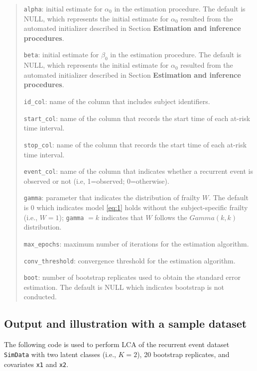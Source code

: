 \begin{quote}
\texttt{alpha}: initial estimate for \(\alpha_0\) in the estimation procedure. The default is NULL, which represents the initial estimate for \(\alpha_0\) resulted from the automated initializer described in Section \textbf{Estimation and inference procedures}.

\texttt{beta}: initial estimate for \({\beta_0}\) in the estimation procedure.
The default is NULL, which represents the initial estimate for \(\alpha_0\) resulted from the automated initializer described in
Section \textbf{Estimation and inference procedures}.

\texttt{id\_col}: name of the column that includes subject identifiers.

\texttt{start\_col}: name of the column that records the start time of each at-risk time interval.

\texttt{stop\_col}: name of the column that records the start time of each at-risk time interval.

\texttt{event\_col}: name of the column that indicates whether a recurrent event is observed or not (i.e, 1=observed; 0=otherwise).

\texttt{gamma}: parameter that indicates the distribution of frailty \(W\). The
default is 0 which indicates model \eqref{eq:1} holds without the
subject-specific frailty (i.e., \(W=1\)); \texttt{gamma} \(= k\) indicates that \(W\) follows the \(Gamma(k,k)\) distribution.

\texttt{max\_epochs}: maximum number of iterations for the estimation algorithm.

\texttt{conv\_threshold}: convergence threshold for the estimation algorithm.

\texttt{boot}: number of bootstrap replicates used to obtain the standard
error estimation. The default is NULL which indicates bootstrap is not conducted.
\end{quote}

\hypertarget{output-and-illustration-with-a-sample-dataset}{%
\subsection{Output and illustration with a sample dataset}\label{output-and-illustration-with-a-sample-dataset}}

The following code is used to perform LCA of the recurrent event dataset \texttt{SimData} with two latent classes (i.e., \(K=2\)), 20 bootstrap replicates, and covariates \texttt{x1} and \texttt{x2}.

